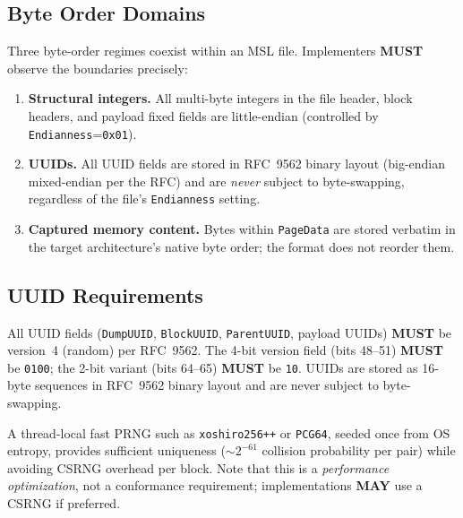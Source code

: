 \documentclass[11pt,a4paper]{article}
\newcommand{\MUST}{\textbf{MUST}}
\newcommand{\MAY}{\textbf{MAY}}
\newcommand{\hex}[1]{\texttt{0x#1}}
\newcommand{\field}[1]{\texttt{#1}}
\begin{document}
\subsection{Byte Order Domains}\label{sec:byteorder}
Three byte-order regimes coexist within an MSL file. Implementers \MUST{} observe the boundaries precisely:
\begin{enumerate}[leftmargin=1.8em, itemsep=2pt]
\item \textbf{Structural integers.} All multi-byte integers in the file header, block headers, and payload fixed fields are little-endian (controlled by \field{Endianness}=\hex{01}).
\item \textbf{UUIDs.} All UUID fields are stored in RFC~9562 binary layout (big-endian mixed-endian per the RFC) and are \emph{never} subject to byte-swapping, regardless of the file's \field{Endianness} setting.
\item \textbf{Captured memory content.} Bytes within \field{PageData} are stored verbatim in the target architecture's native byte order; the format does not reorder them.
\end{enumerate}

\subsection{UUID Requirements}\label{sec:uuids}
All UUID fields (\field{DumpUUID}, \field{BlockUUID}, \field{ParentUUID}, payload UUIDs) \MUST{} be version~4 (random) per RFC~9562. The 4-bit version field (bits 48--51) \MUST{} be \texttt{0100}; the 2-bit variant (bits 64--65) \MUST{} be \texttt{10}. UUIDs are stored as 16-byte sequences in RFC~9562 binary layout and are never subject to byte-swapping.

\begin{notebox}[title={Implementation guidance: UUID generation}]
A thread-local fast PRNG such as \texttt{xoshiro256++} or \texttt{PCG64}, seeded once from OS entropy, provides sufficient uniqueness ($\sim\!2^{-61}$ collision probability per pair) while avoiding CSRNG overhead per block. Note that this is a \emph{performance optimization}, not a conformance requirement; implementations \MAY{} use a CSRNG if preferred.
\end{notebox}
\end{document}
